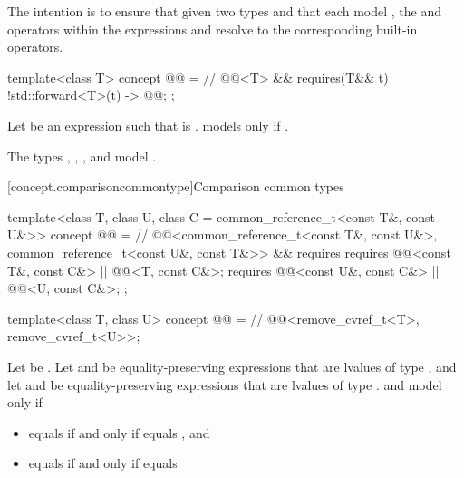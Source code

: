 \pnum
\begin{note}
The intention is to ensure that
given two types  and 
that each model ,
the \tcode{\&\&} and \tcode{||} operators within the expressions
 and
resolve to the corresponding built-in operators.
\end{note}

\begin{itemdecl}
template<class T>
  concept @@ =                // \expos
    @@<T> && requires(T&& t) {
      { !std::forward<T>(t) } -> @@;
    };
\end{itemdecl}

\pnum
Let  be an expression such that
 is .
 models  only if
.

\pnum
\begin{example}
The types
,
,
, and
model .
\end{example}

[concept.comparisoncommontype]{Comparison common types}

\begin{itemdecl}
template<class T, class U, class C = common_reference_t<const T&, const U&>>
  concept @@ =   // \expos
    @@<common_reference_t<const T&, const U&>,
            common_reference_t<const U&, const T&>> &&
    requires {
      requires @@<const T&, const C&> || @@<T, const C&>;
      requires @@<const U&, const C&> || @@<U, const C&>;
    };

template<class T, class U>
  concept @@ =   // \expos
    @@<remove_cvref_t<T>, remove_cvref_t<U>>;
\end{itemdecl}

\pnum
Let  be .
Let  and  be equality-preserving expressions
that are lvalues of type , and
let  and  be equality-preserving expressions
that are lvalues of type .
 and  model
 only if
\begin{itemize}
\item
{} equals
if and only if  equals , and
\item
{} equals
if and only if  equals 
\end{itemize}

